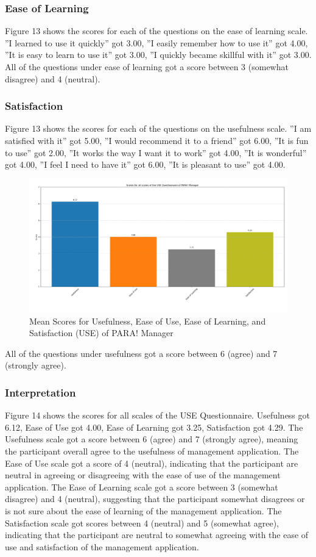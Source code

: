 \documentclass[journal]{./IEEE/IEEEtran}
\begin{document}
\subsubsection{Ease of Learning}
Figure 13 shows the scores for each of the questions on the ease of learning scale. ”I learned to use it quickly” got 3.00, ”I easily remember how to use it” got 4.00, ”It is easy to learn to use it” got 3.00, ”I quickly became skillful with it” got 3.00.
All of the questions under ease of learning got a score between 3 (somewhat disagree) and 4 (neutral).
\subsubsection{Satisfaction}
Figure 13 shows the scores for each of the questions on the usefulness scale. ”I am satisfied with it” got 5.00, ”I would recommend it to a friend” got 6.00, ”It is fun to use” got 2.00, ”It works the way I want it to work” got 4.00, ”It is wonderful” got 4.00, ”I feel I need to have it” got 6.00, ”It is pleasant to use” got 4.00.
\begin{figure}[h]
    \centering
        \includegraphics[scale=0.18]{./figures/manager means total.png}
    \caption{Mean Scores for Usefulness, Ease of Use, Ease of Learning, and Satisfaction (USE) of PARA! Manager}
\end{figure}
All of the questions under usefulness got a score between 6 (agree) and 7 (strongly agree).
\subsubsection{Interpretation}
Figure 14 shows the scores for all scales of the USE Questionnaire.
Usefulness got 6.12, Ease of Use got 4.00, Ease of Learning got 3.25, Satisfaction got 4.29.
The Usefulness scale got a score between 6 (agree) and 7 (strongly agree), meaning the participant overall agree to the usefulness of management application.
The Ease of Use scale got a score of 4 (neutral), indicating that the participant are neutral in agreeing or disagreeing with the ease of use of the management application.
The Ease of Learning scale got a score between 3 (somewhat disagree) and 4 (neutral), suggesting that the participant somewhat disagrees or is not sure about the ease of learning  of the management application.
The Satisfaction scale got scores between 4 (neutral) and 5 (somewhat agree), indicating that the participant are neutral to somewhat agreeing with the ease of use and satisfaction of the management application.
\end{document}
